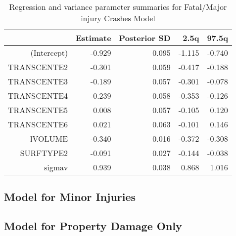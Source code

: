 \documentclass[a4paper]{article}\usepackage[]{graphicx}\usepackage[]{color}
\begin{document}
\begin{table}[ht]
\centering
\begin{tabular}{rrrrr}
  \hline
 & Estimate & Posterior SD & 2.5q & 97.5q \\ 
  \hline
(Intercept) & -0.929 & 0.095 & -1.115 & -0.740 \\ 
  TRANSCENTE2 & -0.301 & 0.059 & -0.417 & -0.188 \\ 
  TRANSCENTE3 & -0.189 & 0.057 & -0.301 & -0.078 \\ 
  TRANSCENTE4 & -0.239 & 0.058 & -0.353 & -0.126 \\ 
  TRANSCENTE5 & 0.008 & 0.057 & -0.105 & 0.120 \\ 
  TRANSCENTE6 & 0.021 & 0.063 & -0.101 & 0.146 \\ 
  lVOLUME & -0.340 & 0.016 & -0.372 & -0.308 \\ 
  SURFTYPE2 & -0.091 & 0.027 & -0.144 & -0.038 \\ 
  sigmav & 0.939 & 0.038 & 0.868 & 1.016 \\ 
   \hline
\end{tabular}
\caption{Regression and variance parameter summaries for Fatal/Major injury Crashes Model} 
\label{fatmajcrash}
\end{table}


\subsection{Model for Minor Injuries}



\subsection{Model for Property Damage Only}
\end{document}
